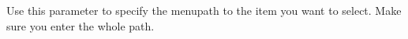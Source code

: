 Use this parameter to specify the menupath to the item you want to select. Make sure you enter the whole path. 



